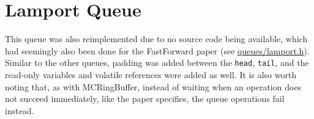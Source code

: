 \section{Lamport Queue}
This queue was also reimplemented due to no source code being available, which had seemingly also been done
for the FastForward paper (see \href{https://github.com/Computerdores/ba/blob/main/src/queues/lamport.h}
{queues/lamport.h})\cite{Lamport}.
Similar to the other queues, padding was added between the \texttt{head}, \texttt{tail}, and the read-only
variables and volatile references were added as well.
It is also worth noting that, as with MCRingBuffer, instead of waiting when an operation does not succeed
immediately, like the paper specifies, the queue operations fail instead\cite{Lamport}.
